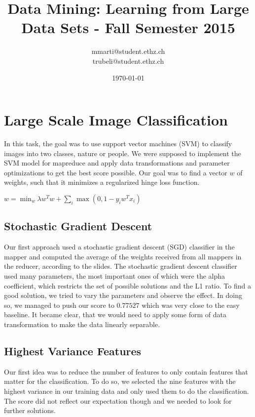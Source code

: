 \documentclass[a4paper, 11pt]{article}
\title{Data Mining: Learning from Large Data Sets - Fall Semester 2015}
\author{mmarti@student.ethz.ch\\ trubeli@student.ethz.ch\\}
\date{\today}
\begin{document}
\maketitle

\section*{Large Scale Image Classification} 
In this task, the goal was to use support vector machines (SVM) to classify images into
two classes, nature or people. We were supposed to implement the SVM model for mapreduce
and apply data transformations and parameter optimizations to get the best score possible.
\vspace{8pt}
Our goal was to find a vector $w$ of weights, such that it minimizes a regularized hinge
loss function.
\begin{center}
   $w = \min_w\lambda w^Tw + \sum_i \max(0, 1-y_iw^Tx_i)$
\end{center}

\subsection{Stochastic Gradient Descent}
Our first approach used a stochastic gradient descent (SGD) classifier in the mapper and computed
the average of the weights received from all mappers in the reducer, according to the slides.
The stochastic gradient descent classifier used many parameters, the most important ones of 
which were the alpha coefficient, which restricts the set of possible solutions and the L1
ratio.
\vspace{8pt}
To find a good solution, we tried to vary the parameters and observe the effect. In doing so, we
managed to push our score to $0.77527$ which was very close to the easy baseline. It became clear,
that we would need to apply some form of data transformation to make the data linearly separable.

\subsection{Highest Variance Features}
Our first idea was to reduce the number of features to only contain features that matter for the
classification. To do so, we selected the nine features with the highest variance in our training
data and only used them to do the classification. The score did not reflect our expectation though
and we needed to look for further solutions.
\end{document}
